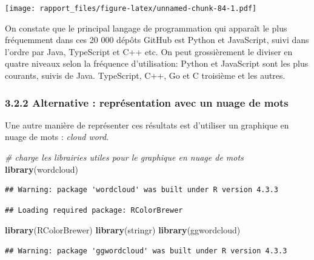 \documentclass[
]{article}
\newenvironment{Shaded}{\begin{snugshade}}{\end{snugshade}}
\newcommand{\CommentTok}[1]{\textcolor[rgb]{0.56,0.35,0.01}{\textit{#1}}}
\newcommand{\FunctionTok}[1]{\textcolor[rgb]{0.13,0.29,0.53}{\textbf{#1}}}
\newcommand{\NormalTok}[1]{#1}
\begin{document}
\texttt{[image: rapport\_files/figure-latex/unnamed-chunk-84-1.pdf]}

On constate que le principal langage de programmation qui apparaît le
plus fréquemment dans ces 20 000 dépôts GitHub est Python et JavaScript,
suivi dans l'ordre par Java, TypeScript et C++ etc. On peut
grossièrement le diviser en quatre niveaux selon la fréquence
d'utilisation: Python et JavaScript sont les plus courants, suivis de
Java. TypeScript, C++, Go et C troisième et les autres.

\subsubsection{3.2.2 Alternative : représentation avec un nuage de
mots}\label{alternative-repruxe9sentation-avec-un-nuage-de-mots}

Une autre manière de représenter ces résultats est d'utiliser un
graphique en nuage de mots : \emph{cloud word}.

\begin{Shaded}
\begin{Highlighting}[]
\CommentTok{\# charge les librairies utiles pour le graphique en nuage de mots}
\FunctionTok{library}\NormalTok{(wordcloud)}
\end{Highlighting}
\end{Shaded}

\begin{verbatim}
## Warning: package 'wordcloud' was built under R version 4.3.3
\end{verbatim}

\begin{verbatim}
## Loading required package: RColorBrewer
\end{verbatim}

\begin{Shaded}
\begin{Highlighting}[]
\FunctionTok{library}\NormalTok{(RColorBrewer)}
\FunctionTok{library}\NormalTok{(stringr)}
\FunctionTok{library}\NormalTok{(ggwordcloud)}
\end{Highlighting}
\end{Shaded}

\begin{verbatim}
## Warning: package 'ggwordcloud' was built under R version 4.3.3
\end{verbatim}
\end{document}
